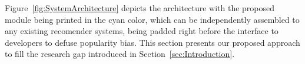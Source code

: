 












Figure~\ref{fig:SystemArchitecture} depicts the architecture with the proposed module being printed in the cyan color, which can be independently assembled to any existing recomender systems, %
being padded right before the interface to developers to defuse popularity bias.
This section presents our proposed approach to fill the research gap introduced in Section~\ref{sec:Introduction}. %





